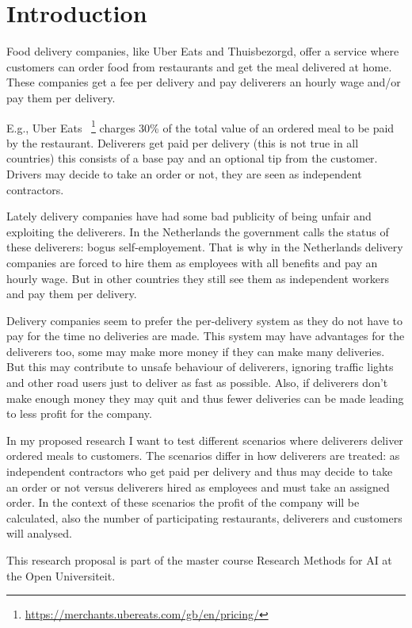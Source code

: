 
\section{Introduction}

Food delivery companies, like Uber Eats and Thuisbezorgd, offer a service where customers can order food from restaurants and get the meal delivered at home.
These companies get a fee per delivery and pay deliverers an hourly wage and/or pay them per delivery.

E.g., Uber Eats ~\footnote{\url{https://merchants.ubereats.com/gb/en/pricing/}} charges 30\% of the total value of an ordered meal to be paid by the restaurant.
Deliverers get paid per delivery (this is not true in all countries) this consists of a base pay and an optional tip from the customer.
Drivers may decide to take an order or not, they are seen as independent contractors.

Lately delivery companies have had some bad publicity of being unfair and exploiting the deliverers.
In the Netherlands the government calls the status of these deliverers: bogus self-employement.
That is why in the Netherlands delivery companies are forced to hire them as employees with all benefits and pay an hourly wage.
But in other countries they still see them as independent workers and pay them per delivery.

Delivery companies seem to prefer the per-delivery system as they do not have to pay for the time no deliveries are made.
This system may have advantages for the deliverers too, some may make more money if they can make many deliveries.
But this may contribute to unsafe behaviour of deliverers, ignoring traffic lights and other road users just to deliver as fast as possible.
Also, if deliverers don't make enough money they may quit and thus fewer deliveries can be made leading to less profit for the company.

In my proposed research I want to test different scenarios where deliverers deliver ordered meals to customers.
The scenarios differ in how deliverers are treated: as independent contractors who get paid per delivery and thus may decide to take an order or not versus
deliverers hired as employees and must take an assigned order.
In the context of these scenarios the profit of the company will be calculated, also the number of participating restaurants, deliverers and customers will analysed.

This research proposal is part of the master course Research Methods for AI at the Open Universiteit.

